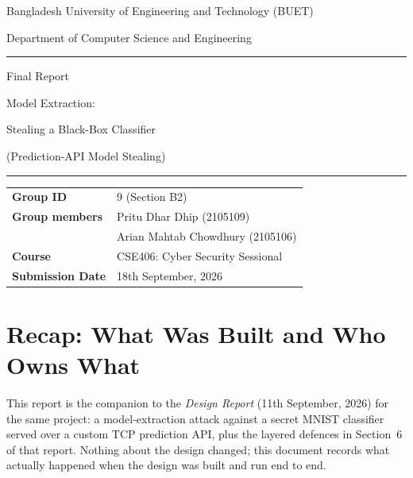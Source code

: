 \documentclass[11pt]{article}
\begin{document}
\begin{titlepage}
\centering
{\color{buetblue}\large Bangladesh University of Engineering and Technology (BUET)\par}
{\color{buetblue}Department of Computer Science and Engineering\par}
\vspace{0.3cm}
\rule{\textwidth}{0.8pt}
\vspace{2.5cm}

{\Huge Final Report\par}
\vspace{0.6cm}
{\LARGE\color{buetblue} Model Extraction:\par Stealing a Black-Box Classifier\par}
\vspace{0.2cm}
{\large\color{buetblue}(Prediction-API Model Stealing)\par}
\vspace{2.5cm}
\rule{\textwidth}{0.8pt}
\vspace{1.5cm}

\begin{flushleft}
\begin{tabular}{@{}p{4cm}l}
\textbf{Group ID} & 9 (Section B2) \\[4pt]
\textbf{Group members} & Pritu Dhar Dhip (2105109) \\
                        & Arian Mahtab Chowdhury (2105106) \\[4pt]
\textbf{Course} & CSE406: Cyber Security Sessional \\[4pt]
\textbf{Submission Date} & 18th September, 2026 \\
\end{tabular}
\end{flushleft}
\end{titlepage}


\section{Recap: What Was Built and Who Owns What}

This report is the companion to the \emph{Design Report} (11th September, 2026) for
the same project: a model-extraction attack against a secret MNIST classifier
served over a custom TCP prediction API, plus the layered defences in Section~6
of that report. Nothing about the design changed; this document records what
actually happened when the design was built and run end to end.
\end{document}
